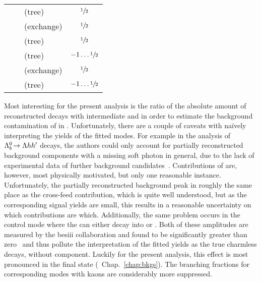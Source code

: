 \begin{table}[htbp]
\begin{tabular}{lllc}
        \midrule
        \decay{\Lb}{\Dz\Lz} & \decay{\bquark}{\cquark \uquarkbar \squark} & (tree) & $\sfrac{1}{2}$ \\
        & \decay{\bquark \uquark (\dquark)}{\cquark \squark (\dquark)} & (exchange) & $\sfrac{1}{2}$ \\
        \midrule
        \decay{\Lb}{\Dzb\Lz} & \decay{\bquark}{\uquark \squark \cquarkbar} & (tree) & $\sfrac{1}{2}$ \\
        \midrule
        \decay{\Xibz}{\Dz\Lz} & \decay{\bquark}{\cquark \dquark \uquarkbar} & (tree) & $-1 \ldots \sfrac{1}{2}$ \\
        & \decay{\bquark \uquark (\squark)}{\cquark \dquark (\squark)} & (exchange) & $\sfrac{1}{2}$ \\
        \midrule
        \decay{\Xibz}{\Dzb\Lz} & \decay{\bquark}{\uquark \dquark \cquarkbar} & (tree) & $-1 \ldots \sfrac{1}{2}$ \\
        \bottomrule
    \end{tabular}
\end{table}

Most interesting for the present analysis is the ratio of the absolute amount of reconstructed decays with intermediate \Lz and \Sz in order to estimate the background contamination of \decay{\Lb}{\Dz\Sz} in \decay{\Lb}{\Dz\Lz}.
Unfortunately, there are a couple of caveats with na\"ively interpreting the yields of the fitted modes.
For example in the analysis of ${{\Lambda}^0_{b}}\!\rightarrow {\ensuremath{\Lambda}}hh'$ decays, the authors could only account for partially reconstructed background components with a missing soft photon in general, due to the lack of experimental data of further \Lb background candidates~\cite{LbToLzhh}.
Contributions of \decay{\Sz}{\Lz\Pgamma} are, however, most physically motivated, but only one reasonable instance.
Unfortunately, the partially reconstructed background \decay{\Sz}{\Lz\Pgamma} peak in roughly the same place as the cross-feed contribution, which is quite well understood, but as the corresponding signal yields are small, this results in a reasonable uncertainty on which contributions are which.
Additionally, the same problem occurs in the \decay{\Lb}{\Lc\Ph} control mode where the \Lc can either decay into \Lz \pip or \Sz \pip.
Both of these amplitudes are measured by the \gls{besiii} collaboration and found to be significantly greater than zero~\cite{LcBR} and thus pollute the interpretation of the fitted yields as the true charmless decays, without \Lc component.
Luckily for the present analysis, this effect is most pronounced in the \Lz\pip\pim final state (\cf{}~Chap.~\ref{chap:bkgs}).
The branching fractions for corresponding modes with kaons are considerably more suppressed.

